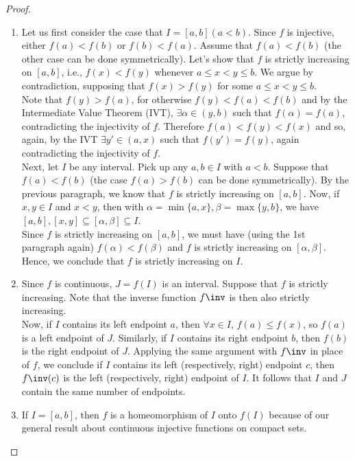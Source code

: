 \begin{proof}
    \begin{enumerate}
        \item Let us first consider the case that $I = [a, b] (a < b)$. Since $f$ is injective, either $f(a) < f(b)$ or $f(b) < f(a)$. Assume that $f(a) < f(b)$ (the other case can be done symmetrically). Let's show that $f$ is strictly increasing on $[a,b]$, i.e., $f(x) < f(y)$ whenever $a \leq x < y \leq b$. We argue by contradiction, supposing that $f(x) > f(y)$ for some $a \leq x < y \leq b$. \\ 
        Note that $f(y) > f(a)$, for otherwise $f(y) < f(a) < f(b)$ and by the Intermediate Value Theorem (IVT), $\exists \alpha \in (y,b)$ such that $f(\alpha) = f(a)$, contradicting the injectivity of $f$. Therefore $f(a) < f(y) < f(x)$ and so, again, by the IVT $\exists y' \in (a,x)$ such that $f(y') = f(y)$, again contradicting the injectivity of $f$. \\
        Next, let $I$ be any interval. Pick up any $a, b \in I$ with $a < b$. Suppose that $f(a) < f(b)$ (the case $f(a) > f(b)$ can be done symmetrically). By the previous paragraph, we know that $f$ is strictly increasing on $[a,b]$. Now, if $x, y \in I$ and $x < y$, then with $\alpha = \min \{a, x\}, \beta = \max \{y, b\}$, we have $[a,b], [x, y] \subseteq [\alpha, \beta] \subseteq I$. \\
        Since $f$ is strictly increasing on $[a,b]$, we must have (using the 1st paragraph again) $f(\alpha) < f(\beta)$ and $f$ is strictly increasing on $[\alpha, \beta]$. Hence, we conclude that $f$ is strictly increasing on $I$.
        \item Since $f$ is continuous, $J = f(I)$ is an interval. Suppose that $f$ is strictly increasing. Note that the inverse function $f \inv$ is then also strictly increasing. \\
        Now, if $I$ contains its left endpoint $a$, then $\forall x \in I$, $f(a) \leq f(x)$, so $f(a)$ is a left endpoint of $J$. Similarly, if $I$ contains its right endpoint $b$, then $f(b)$ is the right endpoint of $J$. Applying the same argument with $f \inv$ in place of $f$, we conclude if $I$ contains its left (respectively, right) endpoint $c$, then $f \inv (c)$ is the left (respectively, right) endpoint of $I$. It follows that $I$ and $J$ contain the same number of endpoints.
        \item If $I = [a,b]$, then $f$ is a homeomorphism of $I$ onto $f(I)$ because of our general result about continuous injective functions on compact sets. \\

\end{enumerate}
\end{proof}
